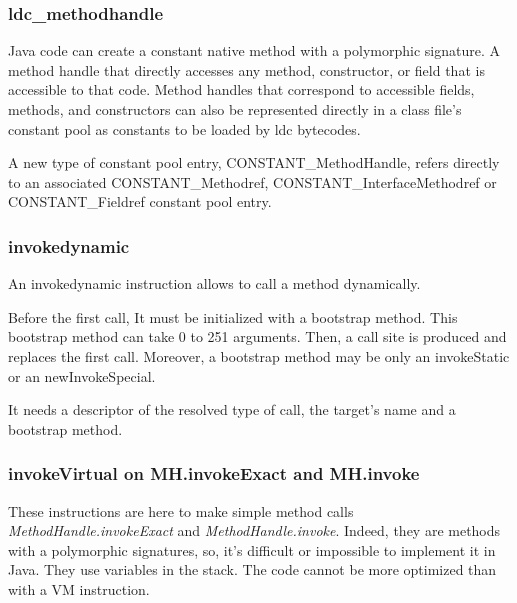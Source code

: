 \documentclass{sigplanconf}
\begin{document}
      \subsubsection{ldc\_methodhandle}
        Java code can create a constant native method with a polymorphic signature.
        A method handle that directly accesses any
        method, constructor, or field that is accessible to that code.
        Method handles that correspond to accessible fields, methods, and constructors
        can also be represented directly in a class file's constant pool
        as constants to be loaded by ldc bytecodes.

        A new type of constant pool entry, CONSTANT\_MethodHandle,
        refers directly to an associated CONSTANT\_Methodref,
        CONSTANT\_InterfaceMethodref or CONSTANT\_Fieldref constant pool entry.

      \subsubsection{invokedynamic}
        An invokedynamic instruction allows to call a method dynamically.

        Before the first call, It must be initialized with a bootstrap method.
        This bootstrap method can take 0 to 251 arguments.
        Then, a call site is produced and replaces the first call.
        Moreover, a bootstrap method may be only an invokeStatic or an newInvokeSpecial.

        It needs a descriptor of the resolved type of call, the target's name and a bootstrap method.

      \subsubsection{invokeVirtual on MH.invokeExact and MH.invoke}
        These instructions are here to make simple method calls\\
        \mbox{\textit{MethodHandle.invokeExact}} and \mbox{\textit{MethodHandle.invoke}}.
        Indeed, they are methods with a polymorphic signatures,
        so, it's difficult or impossible to implement it in Java.
        They use variables in the stack.
        The code cannot be more optimized than with a VM instruction.
\end{document}
